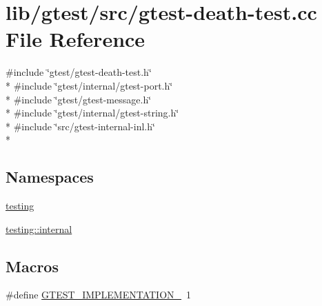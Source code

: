 \hypertarget{gtest-death-test_8cc}{\section{lib/gtest/src/gtest-\/death-\/test.cc File Reference}
\label{gtest-death-test_8cc}
}
{\ttfamily \#include \char`\"{}gtest/gtest-\/death-\/test.\-h\char`\"{}}\\*
{\ttfamily \#include \char`\"{}gtest/internal/gtest-\/port.\-h\char`\"{}}\\*
{\ttfamily \#include \char`\"{}gtest/gtest-\/message.\-h\char`\"{}}\\*
{\ttfamily \#include \char`\"{}gtest/internal/gtest-\/string.\-h\char`\"{}}\\*
{\ttfamily \#include \char`\"{}src/gtest-\/internal-\/inl.\-h\char`\"{}}\\*
\subsection*{Namespaces}
\begin{DoxyCompactItemize}
\item 
\hyperlink{namespacetesting}{testing}
\item 
\hyperlink{namespacetesting_1_1internal}{testing\-::internal}
\end{DoxyCompactItemize}
\subsection*{Macros}
\begin{DoxyCompactItemize}
\item 
\#define \hyperlink{gtest-death-test_8cc_a83bd232fd1077579fada92c31bb7469f}{G\-T\-E\-S\-T\-\_\-\-I\-M\-P\-L\-E\-M\-E\-N\-T\-A\-T\-I\-O\-N\-\_\-}~1
\end{DoxyCompactItemize}
